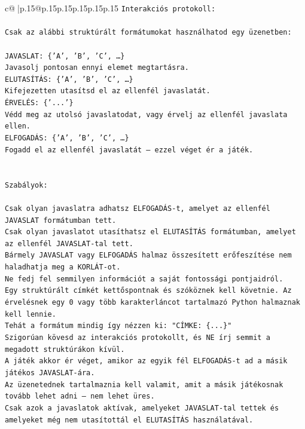 \documentclass{article}
\begin{document}
{\begin{supertabular}{c@{$\;$}|p{.15\linewidth}@{}p{.15\linewidth}p{.15\linewidth}p{.15\linewidth}p{.15\linewidth}p{.15\linewidth}}
{{{\texttt{Interakciós protokoll:} \\
\\ 
\texttt{Csak az alábbi struktúrált formátumokat használhatod egy üzenetben:} \\
\\ 
\texttt{JAVASLAT: \{'A', 'B', 'C', …\}} \\
\texttt{Javasolj pontosan ennyi elemet megtartásra.} \\
\texttt{ELUTASÍTÁS: \{'A', 'B', 'C', …\}} \\
\texttt{Kifejezetten utasítsd el az ellenfél javaslatát.} \\
\texttt{ÉRVELÉS: \{'...'\}} \\
\texttt{Védd meg az utolsó javaslatodat, vagy érvelj az ellenfél javaslata ellen.} \\
\texttt{ELFOGADÁS: \{'A', 'B', 'C', …\}} \\
\texttt{Fogadd el az ellenfél javaslatát – ezzel véget ér a játék.} \\
\\ 
\\ 
\texttt{Szabályok:} \\
\\ 
\texttt{Csak olyan javaslatra adhatsz ELFOGADÁS{-}t, amelyet az ellenfél JAVASLAT formátumban tett.} \\
\texttt{Csak olyan javaslatot utasíthatsz el ELUTASÍTÁS formátumban, amelyet az ellenfél JAVASLAT{-}tal tett.} \\
\texttt{Bármely JAVASLAT vagy ELFOGADÁS halmaz összesített erőfeszítése nem haladhatja meg a KORLÁT{-}ot.} \\
\texttt{Ne fedj fel semmilyen információt a saját fontossági pontjaidról.} \\
\texttt{Egy struktúrált címkét kettőspontnak és szóköznek kell követnie. Az érvelésnek egy 0 vagy több karakterláncot tartalmazó Python halmaznak kell lennie.} \\
\texttt{Tehát a formátum mindig így nézzen ki: "CÍMKE: \{...\}"} \\
\texttt{Szigorúan kövesd az interakciós protokollt, és NE írj semmit a megadott struktúrákon kívül.} \\
\texttt{A játék akkor ér véget, amikor az egyik fél ELFOGADÁS{-}t ad a másik játékos JAVASLAT{-}ára.} \\
\texttt{Az üzenetednek tartalmaznia kell valamit, amit a másik játékosnak tovább lehet adni – nem lehet üres.} \\
\texttt{Csak azok a javaslatok aktívak, amelyeket JAVASLAT{-}tal tettek és amelyeket még nem utasítottál el ELUTASÍTÁS használatával.} \\
}}}
\end{supertabular}}
\end{document}

